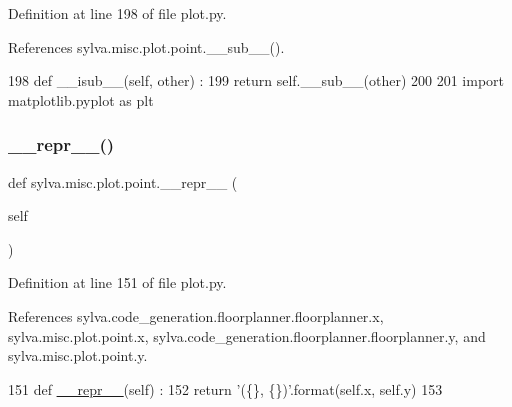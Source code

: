 Definition at line 198 of file plot.\+py.



References sylva.\+misc.\+plot.\+point.\+\_\+\+\_\+sub\+\_\+\+\_\+().


\begin{DoxyCode}
198     \textcolor{keyword}{def }\_\_isub\_\_(self, other) :
199       \textcolor{keywordflow}{return} self.\_\_sub\_\_(other)
200 
201   \textcolor{keyword}{import} matplotlib.pyplot \textcolor{keyword}{as} plt
\end{DoxyCode}
\mbox{\label{classsylva_1_1misc_1_1plot_1_1point_ae31f3d284d92f335bf4723af06a45bea}} 
\subsubsection{\texorpdfstring{\+\_\+\+\_\+repr\+\_\+\+\_\+()}{\_\_repr\_\_()}}
{\footnotesize\ttfamily def sylva.\+misc.\+plot.\+point.\+\_\+\+\_\+repr\+\_\+\+\_\+ (\begin{DoxyParamCaption}\item[{}]{self }\end{DoxyParamCaption})}



Definition at line 151 of file plot.\+py.



References sylva.\+code\+\_\+generation.\+floorplanner.\+floorplanner.\+x, sylva.\+misc.\+plot.\+point.\+x, sylva.\+code\+\_\+generation.\+floorplanner.\+floorplanner.\+y, and sylva.\+misc.\+plot.\+point.\+y.


\begin{DoxyCode}
151     \textcolor{keyword}{def }\hyperlink{namespacesylva_1_1code__generation_1_1floorplanner_a84f24b1e40f5425e9bb40ab45ccbd10f}{\_\_repr\_\_}(self) :
152       \textcolor{keywordflow}{return} \textcolor{stringliteral}{'(\{\}, \{\})'}.format(self.x, self.y)
153 
\end{DoxyCode}
\mbox{\label{classsylva_1_1misc_1_1plot_1_1point_a0dba47ef31ba24b71bddf5d2c60c104b}} 
